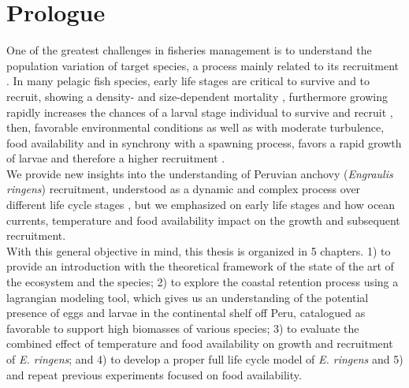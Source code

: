 \chapter{Prologue}

One of the greatest challenges in fisheries management is to understand the population variation of target species, a process mainly related to its recruitment \citep{Cush1971,Lask1981,MaunThor2019}. In many pelagic fish species, early life stages are critical to survive and to recruit, showing a density- and size-dependent mortality \citep{StigRoge2019}, furthermore growing rapidly increases the chances of a larval stage individual to survive and recruit \citep{OsseBoog1997,Soga1997,MeekVigl2006}, then, favorable environmental conditions as well as with moderate turbulence, food availability and in synchrony with a spawning process, favors a rapid growth of larvae and therefore a higher recruitment \citep{CuryRoy1989}.\\

We provide new insights into the understanding of Peruvian anchovy (\textit{Engraulis ringens}) recruitment, understood as a dynamic and complex process over different life cycle stages \citep{DuffBail2005}, but we emphasized on early life stages and how ocean currents, temperature and food availability impact on the growth and subsequent recruitment.\\

With this general objective in mind, this thesis is organized in 5 chapters. 1) to provide an introduction with the theoretical framework of the state of the art of the ecosystem and the species; 2) to explore the coastal retention process using a lagrangian modeling tool, which gives us an understanding of the potential presence of eggs and larvae in the continental shelf off Peru, catalogued as favorable to support high biomasses of various species; 3) to evaluate the combined effect of temperature and food availability on growth and recruitment of \textit{E. ringens};  and 4) to develop a proper full life cycle model of \textit{E. ringens} and 5) and repeat previous experiments focused on food availability. 